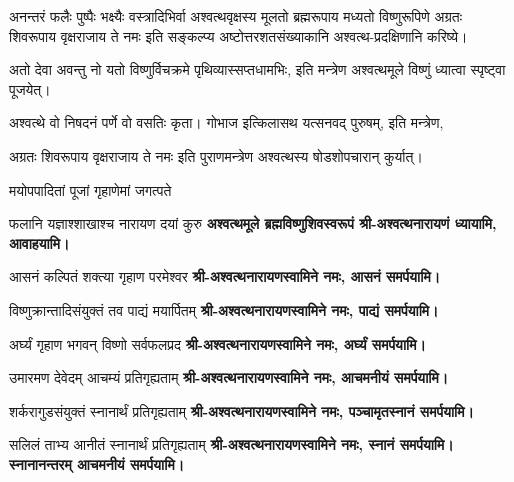 


अनन्तरं फलैः पुष्पैः भक्ष्यैः वस्त्रादिभिर्वा अश्वत्थवृक्षस्य मूलतो ब्रह्मरूपाय
मध्यतो विष्णुरूपिणे अग्रतः शिवरूपाय वृक्षराजाय ते नमः इति सङ्कल्प्य
अष्टोत्तरशतसंख्याकानि अश्वत्थ-प्रदक्षिणानि करिष्ये।

\renewcommand{\devAya}{श्री-अश्वत्थनारायणस्वामिने नमः,}
\begin{center}


अतो देवा अवन्तु नो यतो विष्णुर्विचक्रमे पृथिव्यास्सप्तधामभिः, इति मन्त्रेण अश्वत्थमूले विष्णुं ध्यात्वा स्पृष्ट्वा पूजयेत्।

अश्वत्थे वो निषदनं पर्णे वो वसतिः कृता। गोभाज इत्किलासथ यत्सनवद् पुरुषम्, इति मन्त्रेण,

{अग्रतः शिवरूपाय वृक्षराजाय ते नमः}
इति पुराणमन्त्रेण अश्वत्थस्य षोडशोपचारान् कुर्यात्।

{मयोपपादितां पूजां गृहाणेमां जगत्पते}

{फलानि यज्ञाश्शाखाश्च नारायण दयां कुरु}
\textbf{अश्वत्थमूले ब्रह्मविष्णुशिवस्वरूपं श्री-अश्वत्थनारायणं ध्यायामि, आवाहयामि।}
\medskip

{आसनं कल्पितं शक्त्या गृहाण परमेश्वर}
\textbf{\devAya{} आसनं समर्पयामि।}
\medskip

{विष्णुक्रान्तादिसंयुक्तं तव पाद्यं मयार्पितम्}
\textbf{\devAya{} पाद्यं समर्पयामि।}
\medskip

{अर्घ्यं गृहाण भगवन् विष्णो सर्वफलप्रद}
\textbf{\devAya{} अर्घ्यं समर्पयामि।}
\medskip

{उमारमण देवेदम् आचम्यं प्रतिगृह्यताम्}
\textbf{\devAya{} आचमनीयं समर्पयामि।}
\medskip

{शर्करागुडसंयुक्तं स्नानार्थं प्रतिगृह्यताम्}
\textbf{\devAya{} पञ्चामृतस्नानं समर्पयामि।}
\medskip

{सलिलं ताभ्य आनीतं स्नानार्थं प्रतिगृह्यताम्}
\textbf{\devAya{} स्नानं समर्पयामि। स्नानानन्तरम् आचमनीयं समर्पयामि।}
\medskip


\end{center}
